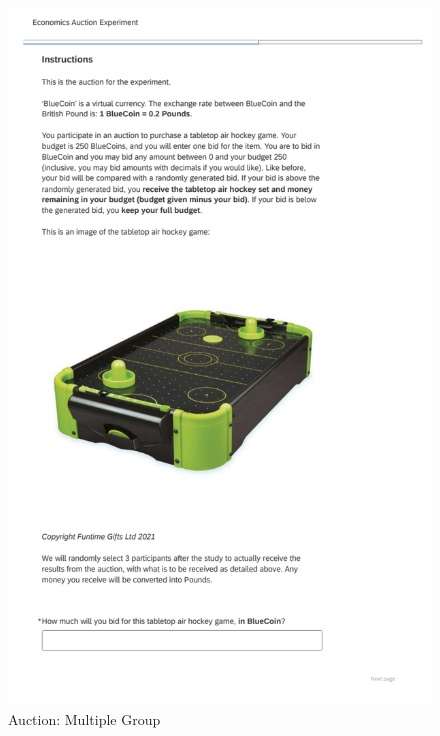 \documentclass[
]{report}
\begin{document}
\begin{figure}[H]

{\centering \includegraphics{experiment_instructions/auction_multiple.png}

}

\caption{Auction: Multiple Group}

\end{figure}%
\end{document}
